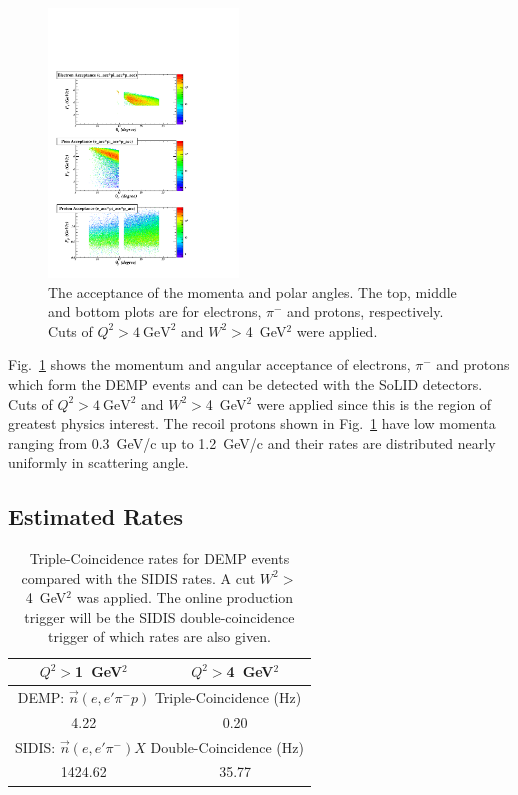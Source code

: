 \begin{figure}[!ht]
 \begin{center}
   \includegraphics[type=pdf,
     ext=.pdf,read=.pdf,width=0.45\textwidth]{./figures/E11_acc_epip_Q2gt4_02Hz}
   \caption[The acceptance of the momenta and scattering angles for electrons,
    $\pi^{-}$ and protons]{\footnotesize{The acceptance of the momenta and
polar angles. The top, middle and bottom plots are for electrons, $\pi^{-}$ and
protons, respectively. Cuts of $Q^{2}>4~\mathrm{GeV^{2}}$ and $W^2>$4~GeV$^2$ were applied.}}
  \label{p_theta}
  \end{center}
\end{figure}

Fig.~\ref{p_theta} shows the momentum and angular acceptance of electrons,
$\pi^{-}$ and protons which form the DEMP events and can be detected with the
SoLID detectors.  Cuts of $Q^{2}>4~\mathrm{GeV^{2}}$ and $W^2>$4~GeV$^2$ were applied since this is the region
of greatest physics interest.  The recoil protons shown in Fig.~\ref{p_theta} have low momenta ranging from 0.3~GeV/c up
to 1.2~GeV/c and their rates are distributed nearly uniformly in scattering
angle.

\subsection{Estimated Rates
\label{sec:rates}}

\begin{table}[!ht]
\centering
\begin{tabular}{|c|c|}
 \hline
  $Q^2>$1~GeV$^2$ & $Q^2>$4~GeV$^2$\\
 \hline
\multicolumn{2}{|c|}{DEMP: $\vec{n}(e,e'\pi^{-}p)$ Triple-Coincidence (Hz)}\\
 \hline
 4.22   &  0.20 \\
 \hline
\multicolumn{2}{|c|}{SIDIS: $\vec{n}(e,e'\pi^{-})X$ Double-Coincidence (Hz)}\\
 \hline
   1424.62  & 35.77   \\
 \hline
\end{tabular}
\caption[Triple-Coincidence rates for
  neutron-DEMP]{\footnotesize{Triple-Coincidence rates for DEMP events compared
    with the SIDIS rates. A cut $W^2>$4~GeV$^2$ was applied. The online production
    trigger will be the SIDIS double-coincidence trigger of which rates are
    also given.}}
\label{rate_table}
\end{table} 

